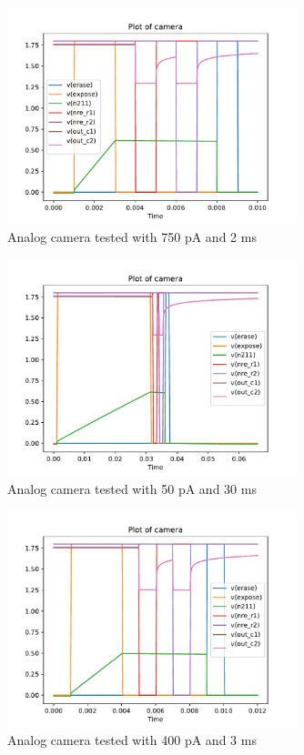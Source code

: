 \begin{figure}[H]
  \centering
  \includegraphics[width=0.75\textwidth]{../analog/camera7502}
  \caption{Analog camera tested with 750 pA and 2 ms}
  \label{fig:analog7502}
\end{figure}

\begin{figure}[H]
  \centering
  \includegraphics[width=0.75\textwidth]{../analog/camera5030}
  \caption{Analog camera tested with 50 pA and 30 ms}
  \label{fig:analog5030}
\end{figure}

\begin{figure}[H]
  \centering
  \includegraphics[width=0.75\textwidth]{../analog/camera4003typical}
  \caption{Analog camera tested with 400 pA and 3 ms}
  \label{fig:analog4003}
\end{figure}

